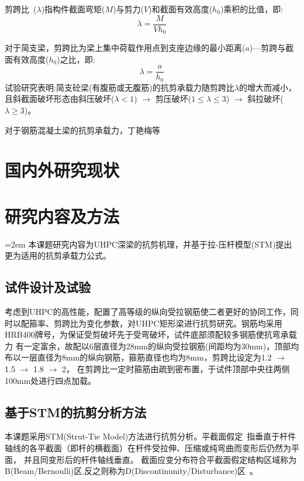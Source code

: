 \documentclass[a4paper,11pt]{article}
\begin{document}
\begin{mybox}
剪跨比~\cite{叶见曙1997结构设计原理}($\lambda$)指构件截面弯矩($M$)与剪力($V$)和截面有效高度($h_0$)乘积的比值，即: \[\lambda = \frac{M}{Vh_0}\]

对于简支梁，剪跨比为梁上集中荷载作用点到支座边缘的最小距离($a$)---剪跨与截面有效高度($h_0$)之比，即: \[\lambda = \frac{a}{h_0}\]
试验研究表明:简支砼梁(有腹筋或无腹筋)的抗剪承载力随剪跨比$\lambda$的增大而减小，且斜截面破坏形态由斜压破坏($\lambda<1$) $\rightarrow$ 剪压破坏($1 \leqslant \lambda \leqslant 3$) 
$\rightarrow$ 斜拉破坏($\lambda \geqslant 3$)。

对于钢筋混凝土梁的抗剪承载力，丁艳梅等~\cite{丁艳梅2009钢筋混凝土梁斜截面受剪承载力统一计算公式的研究}



\end{mybox}



\section{国内外研究现状}

\section{研究内容及方法}

\begin{mybox}
\parindent=2em 本课题研究内容为UHPC深梁的抗剪机理，并基于拉-压杆模型(STM)提出更为适用的抗剪承载力公式。
\subsection{试件设计及试验}
\indent 考虑到UHPC的高性能，配置了高等级的纵向受拉钢筋使二者更好的协同工作，同时以配箍率、剪跨比为变化参数，对UHPC矩形梁进行抗剪研究。钢筋均采用HRB400牌号，为保证受剪破坏先于受弯破坏，试件底部须配较多钢筋使抗弯承载力
有一定富余，故配以6层直径为28mm的纵向受拉钢筋(间距均为30mm)，顶部均布以一层直径为8mm的纵向钢筋，箍筋直径也均为8mm，剪跨比设定为1.2 $\rightarrow$ 1.5 $\rightarrow$ 1.8 $\rightarrow$ 2，
在剪跨比一定时箍筋由疏到密布置，于试件顶部中央往两侧100mm处进行四点加载。
\subsection{基于STM的抗剪分析方法}
\indent 本课题采用STM(Strut-Tie Model)方法进行抗剪分析。平截面假定~\cite{刘鸿文2011材}指垂直于杆件轴线的各平截面（即杆的横截面）在杆件受拉伸、压缩或纯弯曲而变形后仍然为平面，
并且同变形后的杆件轴线垂直。
截面应变分布符合平截面假定结构区域称为B(Beam/Bernoulli)区,反之则称为D(Discontinunity/Disturbance)区~\cite{刘钊2008拉压杆模型在混凝土梁桥中应用与研究进展}。


\end{mybox}
\end{document}
